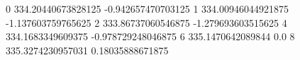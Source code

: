0 334.20440673828125 -0.942657470703125
1 334.00946044921875 -1.137603759765625
2 333.86737060546875 -1.279693603515625
4 334.1683349609375 -0.978729248046875
6 335.1470642089844 0.0
8 335.3274230957031 0.18035888671875
